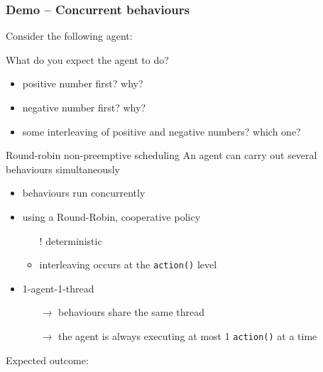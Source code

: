 \documentclass{beamer}\mode<presentation>{\usetheme{AMSCesenaPurpleAndGold}}
\begin{document}
\begin{frame}[allowframebreaks]
    \frametitle{Demo \currentDemo{} -- Concurrent behaviours}

    Consider the following agent:
    

    \bigskip

    What do you expect the agent to do?
    \begin{itemize}
        \item positive number first? why?
        \item negative number first? why?
        \item some \alert{interleaving} of positive and negative numbers? which one?
    \end{itemize}

    \framebreak

    \begin{block}{Round-robin non-preemptive scheduling}
        An agent can carry out \alert{several} behaviours \alert{simultaneously}
        \begin{itemize}
            \item behaviours run concurrently

            \item using a \alert{Round-Robin}, cooperative policy
            \begin{itemize}
                \item[!] deterministic
                \item interleaving occurs at the \texttt{action()} level
            \end{itemize}

            \item 1-agent-1-thread
            \begin{itemize}
                \item[$\rightarrow$] behaviours share the same thread
                \item[$\rightarrow$] the agent is always executing at most 1 \texttt{action()} at a time
            \end{itemize}
        \end{itemize}
    \end{block}

    \framebreak

    Expected outcome:
    


\end{frame}
\end{document}
